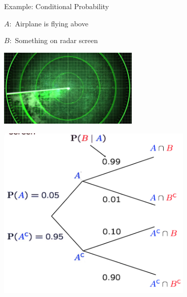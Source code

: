 \documentclass[fleqn,aspectratio=169]{beamer}
\begin{document}
\begin{frame}{Example: Conditional Probability}

{
\plitemsep 0.05in
\bci

\item $A:$ Airplane is flying above
\item $B:$ Something on radar screen

\eci 




}
{
\centering
\includegraphics[width=0.5\textwidth]{L2_radar.jpg}

\bigskip
\includegraphics[width=0.7\textwidth]{L2_cond_ex.png}
}
\end{frame}
\end{document}
